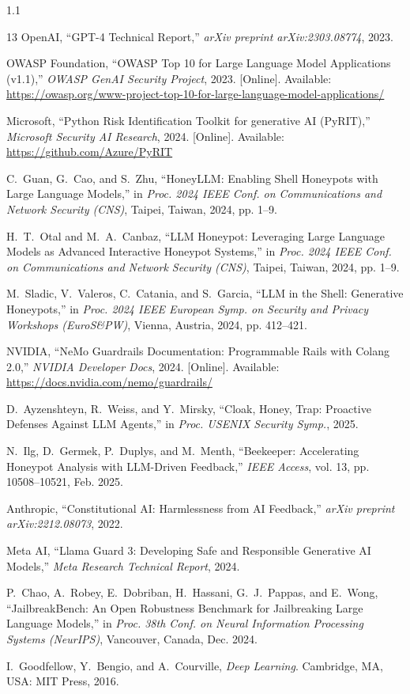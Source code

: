 \documentclass[12pt,a4paper,oneside]{report}
\begin{document}
\begin{spacing}{1.1}
\begin{thebibliography}{13}
OpenAI, ``GPT-4 Technical Report,'' \textit{arXiv preprint arXiv:2303.08774}, 2023.

OWASP Foundation, ``OWASP Top 10 for Large Language Model Applications (v1.1),'' \textit{OWASP GenAI Security Project}, 2023. [Online]. Available: \url{https://owasp.org/www-project-top-10-for-large-language-model-applications/}

Microsoft, ``Python Risk Identification Toolkit for generative AI (PyRIT),'' \textit{Microsoft Security AI Research}, 2024. [Online]. Available: \url{https://github.com/Azure/PyRIT}

C.~Guan, G.~Cao, and S.~Zhu, ``HoneyLLM: Enabling Shell Honeypots with Large Language Models,'' in \textit{Proc. 2024 IEEE Conf. on Communications and Network Security (CNS)}, Taipei, Taiwan, 2024, pp. 1--9.

H.~T.~Otal and M.~A.~Canbaz, ``LLM Honeypot: Leveraging Large Language Models as Advanced Interactive Honeypot Systems,'' in \textit{Proc. 2024 IEEE Conf. on Communications and Network Security (CNS)}, Taipei, Taiwan, 2024, pp. 1--9.

M.~Sladic, V.~Valeros, C.~Catania, and S.~Garcia, ``LLM in the Shell: Generative Honeypots,'' in \textit{Proc. 2024 IEEE European Symp. on Security and Privacy Workshops (EuroS\&PW)}, Vienna, Austria, 2024, pp. 412--421.

NVIDIA, ``NeMo Guardrails Documentation: Programmable Rails with Colang 2.0,'' \textit{NVIDIA Developer Docs}, 2024. [Online]. Available: \url{https://docs.nvidia.com/nemo/guardrails/}

D.~Ayzenshteyn, R.~Weiss, and Y.~Mirsky, ``Cloak, Honey, Trap: Proactive Defenses Against LLM Agents,'' in \textit{Proc. USENIX Security Symp.}, 2025.

N.~Ilg, D.~Germek, P.~Duplys, and M.~Menth, ``Beekeeper: Accelerating Honeypot Analysis with LLM-Driven Feedback,'' \textit{IEEE Access}, vol. 13, pp. 10508--10521, Feb. 2025.

Anthropic, ``Constitutional AI: Harmlessness from AI Feedback,'' \textit{arXiv preprint arXiv:2212.08073}, 2022.

Meta AI, ``Llama Guard 3: Developing Safe and Responsible Generative AI Models,'' \textit{Meta Research Technical Report}, 2024.

P.~Chao, A.~Robey, E.~Dobriban, H.~Hassani, G.~J.~Pappas, and E.~Wong, ``JailbreakBench: An Open Robustness Benchmark for Jailbreaking Large Language Models,'' in \textit{Proc. 38th Conf. on Neural Information Processing Systems (NeurIPS)}, Vancouver, Canada, Dec. 2024.

I.~Goodfellow, Y.~Bengio, and A.~Courville, \textit{Deep Learning}. Cambridge, MA, USA: MIT Press, 2016.
\end{thebibliography}
\end{spacing}
\end{document}
